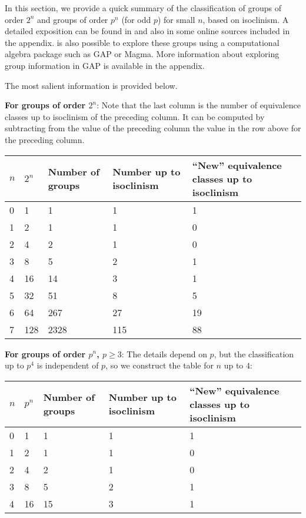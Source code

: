 \documentclass{ucetd}
\begin{document}
In this section, we provide a quick summary of the classification of
groups of order $2^n$ and groups of order $p^n$ (for odd $p$) for
small $n$, based on isoclinism. A detailed exposition can be found in
\cite{HallSenior} and also in some online sources included in the
appendix. is also possible to explore these groups using a
computational algebra package such as GAP or Magma. More information
about exploring group information in GAP is available in the appendix.

The most salient information is provided below.

{\bf For groups of order $2^n$}: Note that the last column is the
number of equivalence classes up to isoclinism of the preceding
column. It can be computed by subtracting from the value of the
preceding column the value in the row above for the preceding column.

\begin{tabular}{|l|l|l|l|l|}
  \hline
  $n$ & $2^n$ & Number of groups & Number up to isoclinism & ``New'' equivalence classes up to isoclinism\\
  \hline
  0 & 1 & 1 & 1 & 1\\\hline
  1 & 2 & 1 & 1 & 0\\\hline
  2 & 4 & 2 & 1 & 0\\\hline
  3 & 8 & 5 & 2 & 1\\\hline
  4 &16 &14 & 3 & 1\\\hline
  5 &32 &51 & 8 & 5\\\hline
  6 &64&267 & 27& 19\\\hline
  7&128&2328&115& 88\\\hline
\end{tabular}

{\bf For groups of order $p^n$, $p \ge 3$}: The details depend on $p$,
but the classification up to $p^4$ is independent of $p$, so we
construct the table for $n$ up to $4$:

\begin{tabular}{|l|l|l|l|l|}
  \hline
  $n$ & $p^n$ & Number of groups & Number up to isoclinism & ``New'' equivalence classes up to isoclinism\\
  \hline
  0 & 1 & 1 & 1 & 1\\\hline
  1 & 2 & 1 & 1 & 0\\\hline
  2 & 4 & 2 & 1 & 0\\\hline
  3 & 8 & 5 & 2 & 1\\\hline
  4 &16 &15 & 3 & 1\\\hline
\end{tabular}
\end{document}

